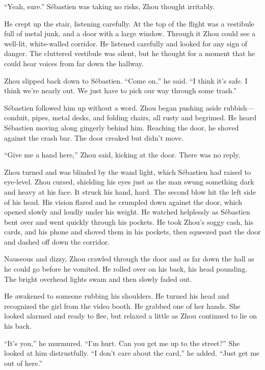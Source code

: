 \documentclass[10pt,b5paper]{article}
\begin{document}
``Yeah, sure.'' S\'{e}bastien was taking no risks, Zhou thought irritably.

He crept up the stair, listening carefully. At the top of the
flight was a vestibule full of metal junk, and a door with a
large window. Through it Zhou could see a well-lit, white-walled
corridor. He listened carefully and looked for any sign of danger.
The cluttered vestibule was silent, but he thought for a moment
that he could hear voices from far down the hallway.

Zhou slipped back down to S\'{e}bastien. ``Come on,'' he said. ``I think
it's safe. I think we're nearly out. We just have to pick our way
through some trash.''

S\'{e}bastien followed him up without a word. Zhou began pushing
aside rubbish---conduit, pipes, metal desks, and folding chairs,
all rusty and begrimed. He heard S\'{e}bastien moving along gingerly
behind him. Reaching the door, he shoved against the crash bar. The
door creaked but didn't move.

``Give me a hand here,'' Zhou said, kicking at the door. There was
no reply.

Zhou turned and was blinded by the wand light, which S\'{e}bastien had
raised to eye-level. Zhou cursed, shielding his eyes just as the man
swung something dark and heavy at his face. It struck his hand,
hard. The second blow hit the left side of his head. His vision
flared and he crumpled down against the door, which opened slowly
and loudly under his weight. He watched helplessly as S\'{e}bastien bent
over and went quickly through his pockets. He took Zhou's soggy
cash, his cards, and his phone and shoved them in his pockets,
then squeezed past the door and dashed off down the corridor.

Nauseous and dizzy, Zhou crawled through the door and as far down
the hall as he could go before he vomited. He rolled over on his
back, his head pounding. The bright overhead lights swam and then
slowly faded out.

\bigskip

He awakened to someone rubbing his shoulders. He turned his head
and recognized the girl from the video booth. He grabbed one of her
hands. She looked alarmed and ready to flee, but relaxed a little
as Zhou continued to lie on his back.

``It's you,'' he murmured. ``I'm hurt. Can you get me up to the street?''
She looked at him distrustfully. ``I don't care about the card,''
he added. ``Just get me out of here.''
\end{document}
